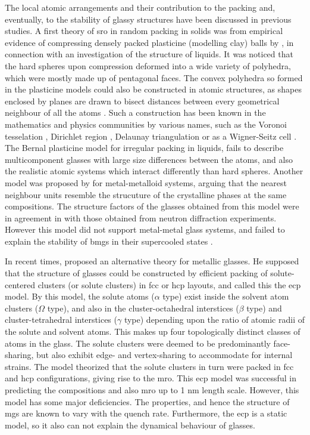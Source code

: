 The local atomic arrangements and their contribution to the packing and, eventually, to the stability of glassy structures have been discussed in previous studies. A first theory of \gls{sro} in random packing in solids was from empirical evidence of compressing densely packed plasticine (modelling clay) balls by \textcite{Bernal1959}, in connection with an investigation of the structure of liquids. It was noticed that the hard spheres upon compression deformed into a wide variety of polyhedra, which were mostly made up of pentagonal faces. The convex polyhedra so formed in the plasticine models could also be constructed in atomic structures, as shapes enclosed by planes are drawn to bisect distances between every geometrical neighbour of all the atoms \cite{Bernal1959,Finney1970a}. Such a construction has been known in the mathematics and physics communities by various names, such as the Voronoi tesselation \cite{Voronoi1908,Coxeter1973}, Dirichlet region \cite{Dirichlet1850}, Delaunay triangulation \cite{Delaunay1934} or as a Wigner-Seitz cell \cite{Kittel2004}. The Bernal plasticine model for irregular packing in liquids, fails to describe multicomponent glasses with large size differences between the atoms, and also the realistic atomic systems which interact differently than hard spheres. Another model was proposed by \textcite{Gaskell1978} for metal-metalloid systems, arguing that the nearest neighbour units resemble the strucuture of the crystalline phases at the same compositions. The structure factors of the glasses obtained from this model were in agreement in with those obtained from neutron diffraction experiments. However this model did not support metal-metal glass systems, and failed to explain the stability of \gls{bmg}s in their supercooled states \cite{Chen2011a}. \par

In recent times, \textcite{Miracle2004} proposed an alternative theory for metallic glasses. He supposed that the structure of glasses could be constructed by efficient packing of solute-centered clusters (or solute clusters) in \gls{fcc} or \gls{hcp} layouts, and called this the \gls{ecp} model. By this model, the solute atoms ($\alpha$ type) exist inside the solvent atom clusters ($\Omega$ type), and also in the cluster-octahedral interstices ($\beta$ type) and cluster-tetrahedral interstices ($\gamma$ type) depending upon the ratio of atomic radii of the solute and solvent atoms. This makes up four topologically distinct classes of atoms in the glass. The solute clusters were deemed to be predominantly face-sharing, but also exhibit edge- and vertex-sharing to accommodate for internal strains. The model theorized that the solute clusters in turn were packed in \gls{fcc} and \gls{hcp} configurations, giving rise to the \gls{mro}. This \gls{ecp} model was successful in predicting the compositions and also \gls{mro} up to 1 nm length scale. However, this model has some major deficiencies. The properties, and hence the structure of \gls{mg}s are known to vary with the quench rate. Furthermore, the \gls{ecp} is a static model, so it also can not explain the dynamical behaviour of glasses. \par

